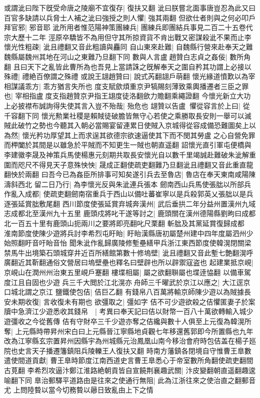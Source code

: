 或謂泚曰陛下旣受命唐之陵廟不宜復存|{
	復扶又翻}
泚曰朕嘗北面事唐豈忍為此又曰百官多缺請以兵脅士人補之泚曰強授之則人懼|{
	強其兩翻}
但欲仕者則與之何必叩戶拜官邪|{
	邪音耶}
泚所用者惟范陽神策團練兵|{
	團練兵即團結兵事見二百二十五卷代宗大歷十二年}
涇原卒驕皆不為用但守其所掠資貨不肯出戰又密謀殺泚不果而止李懷光性粗疎|{
	泚且禮翻又音此粗讀與麤同}
自山東來赴難|{
	自魏縣行營來赴奉天之難魏縣屬魏州其地在河山之東難乃旦翻下同}
數與人言盧趙贊白志貞之姦佞|{
	數所角翻}
且曰天下之亂皆此曹所為也吾見上當請誅之旣解奉天之圍自矜其功謂上必接以殊禮|{
	禮絶百僚謂之殊禮}
或說王翃趙贊曰|{
	說式芮翻翃戶萌翻}
懷光緣道憤歎以為宰相謀議乖方|{
	乖方猶言失所也}
度支賦歛煩重京尹犒賜刻薄致乘輿播遷者三臣之罪也|{
	宰相指盧度支指趙贊京尹指王翃度徒洛翻歛力贍翻乘繩證翻}
今懷光新立大功上必披襟布誠詢得失使其言入豈不殆哉|{
	殆危也}
翃贊以告盧懼從容言於上曰|{
	從千容翻下同}
懷光勲業社稷是賴賊徒破膽皆無守心若使之乘勝取長安則一舉可以滅賊此破竹之勢也今聽其入朝必當賜宴留連累日使賊入京城得從容成備恐難圖矣上以為然|{
	懷光矜功厚望其上而求逞其欲德宗欲速逼使其下而不閔其勞盧之心自營免罪而柙闔於其間是以雖急於平賊而不知更生一賊也朝直遥翻}
詔懷光直引軍屯便橋與李建徽李晟及神策兵馬使楊惠元刻期共取長安懷光自以數千里竭誠赴難破朱泚解重圍而咫尺不得見天子意殊怏怏|{
	晟成正翻使疏吏翻難乃旦翻泚且禮翻又音此重直龍翻怏於兩翻}
曰吾今已為姦臣所排事可知矣遂引兵去至魯店|{
	魯店在奉天東南咸陽陳濤斜西北}
留二日乃行|{
	為李懷光反與朱泚連兵張本}
劒南西山兵馬使張朏以所部兵作亂入成都|{
	使疏吏翻劒南宿重兵于西山以備吐蕃崔寧以是兵殺郭英乂張朏以是兵逐張延賞朏敷尾翻}
西川節度使張延賞弃城奔漢州|{
	武后垂拱二年分益州置漢州九域志成都北至漢州九十五里}
鹿頭戍將叱干遂等討之|{
	鹿頭關在漢州德陽縣劉昫曰成都北一百五十里有鹿頭山扼兩川之要將即亮翻叱尺栗翻}
斬朏及其黨延賞復歸成都　淮南節度使陳少遊將兵討李希烈屯盱眙|{
	盱眙漢縣唐初屬楚州建中四年度屬泗州少始照翻盱音吁眙音怡}
聞朱泚作亂歸廣陵修塹壘繕甲兵浙江東西節度使韓滉閉關梁禁馬牛出境築石頭城穿井近百所繕館第數十修塢壁|{
	泚且禮翻又音此塹七艶翻滉呼廣翻近其靳翻通俗文營居曰塢壁壘也釋名曰壁辟也所以辟禦寇盗也}
起建業抵京峴|{
	京峴山在潤州州治東五里峴戶蹇翻}
樓堞相屬|{
	屬之欲翻聨屬也堞逹恊翻}
以備車駕度江且自固也少遊兵三千大閲於江北滉亦舟師三千曜武於京江以應之|{
	大江逕京口城北謂之京江}
鹽鐵使包佶|{
	佶巨乙翻}
有錢帛八百萬將輸京師陳少遊以為賊據長安未期收復|{
	言收復未有期也}
欲彊取之|{
	彊如字}
佶不可少遊欲殺之佶懼匿妻子於案牘中急濟江少遊悉收其錢帛　|{
	考異曰奉天記曰佶以財幣一百八十萬欲轉輸入城少遊彊收之今從舊傳}
佶有守財卒三千少遊亦奪之佶纔與數十人俱至上元復為韓滉所奪|{
	上元縣時帶昇州宋白曰上元縣晉江寧縣地貞觀七年移還舊郭即今所置縣也九年改為江寧縣玄宗置昇州因縣宇為州城縣元治鳳凰山南今移治會府時包佶盖在楊子廵院也史言天子播遷籓鎮阻兵陵轢王人復扶又翻}
時南方藩鎮各閉境自守惟曹王臯數遣使間道貢獻|{
	曹王臯時節度江南西道史言曹王臯悉心于帝室數所角翻使疏吏翻間古莧翻}
李希烈攻逼汴鄭江淮路絶朝貢皆自宣饒荆襄趣武關|{
	汴皮變翻朝直遥翻趣逡喻翻下同}
臯治郵驛平道路由是往來之使通行無阻|{
	此為江浙往來之使治直之翻郵音尤}
上問陸䞇以當今切務䞇以曏日致亂由上下之情

